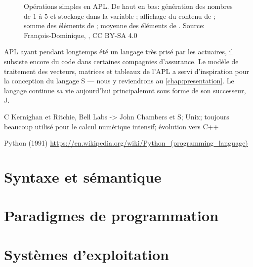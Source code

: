 \begin{figure}
  \centering
  \caption[Opérations simples en APL.]{Opérations simples en APL. De
    haut en bas: génération des nombres de $1$ à $5$ et stockage dans
    la variable ; affichage du contenu de ; somme des
    éléments de ; moyenne des éléments de . {\small Source:
    François-Dominique,
    , CC BY-SA 4.0}}
  \label{fig:informatique:apl}
\end{figure}

APL ayant pendant longtemps été un langage très prisé par les
actuaires, il subsiste encore du code dans certaines compagnies
d'assurance. Le modèle de traitement des vecteurs, matrices et
tableaux de l'APL a servi d'inspiration pour la conception du langage
S --- nous y reviendrons au \autoref{chap:presentation}. Le langage
continue sa vie aujourd'hui principalemnt sous forme de son
successeur, J.



C Kernighan et Ritchie, Bell Labs -> John Chambers et S; Unix;
toujours beaucoup utilisé pour le calcul numérique intensif; évolution
vers C++

Python (1991)
\url{https://en.wikipedia.org/wiki/Python_(programming_language)}







\section{Syntaxe et sémantique}
\label{sec:informatique:syntaxe}

\section{Paradigmes de programmation}
\label{sec:informatique:paradigmes}

\section{Systèmes d'exploitation}
\label{sec:informatique:os}



